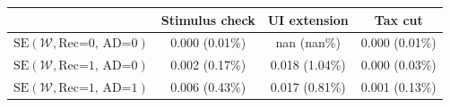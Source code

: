 \begin{tabular}{@{}lccc@{}}
\toprule
                          & Stimulus check      & UI extension    & Tax cut    \\  \midrule
$\mathrm{SE}(\mathcal{W}, \text{Rec=0, AD=0})$ & 0.000 (0.01\%)  & nan (nan\%)  & 0.000 (0.01\%)     \\
$\mathrm{SE}(\mathcal{W}, \text{Rec=1, AD=0})$ & 0.002 (0.17\%)  & 0.018 (1.04\%)  & 0.000 (0.03\%)     \\
$\mathrm{SE}(\mathcal{W}, \text{Rec=1, AD=1})$ & 0.006 (0.43\%)  & 0.017 (0.81\%)  & 0.001 (0.13\%)     \\ \bottomrule
\end{tabular}
